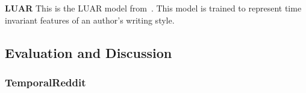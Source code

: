 \noindent \textbf{LUAR} This is the LUAR model from~\cite{riverastao2021learning}. 
This model is trained to represent time invariant features of an author's writing style.

\subsection{Evaluation and Discussion}

\subsubsection{TemporalReddit}

